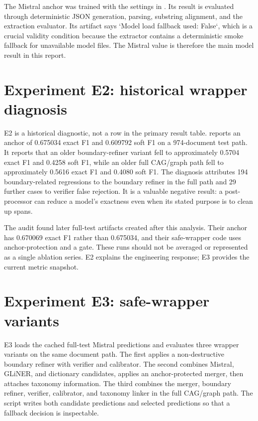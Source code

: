 The Mistral anchor was trained with the settings in . Its result is evaluated through deterministic JSON generation, parsing, substring alignment, and the extraction evaluator. Its artifact says `Model load fallback used: False`, which is a crucial validity condition because the extractor contains a deterministic smoke fallback for unavailable model files. The Mistral value is therefore the main model result in this report.

\section{Experiment E2: historical wrapper diagnosis}

E2 is a historical diagnostic, not a row in the primary result table.  reports an anchor of 0.675034 exact F1 and 0.609792 soft F1 on a 974-document test path. It reports that an older boundary-refiner variant fell to approximately 0.5704 exact F1 and 0.4258 soft F1, while an older full CAG/graph path fell to approximately 0.5616 exact F1 and 0.4080 soft F1. The diagnosis attributes 194 boundary-related regressions to the boundary refiner in the full path and 29 further cases to verifier false rejection. It is a valuable negative result: a post-processor can reduce a model's exactness even when its stated purpose is to clean up spans.

The audit found later full-test artifacts created after this analysis. Their anchor has 0.670069 exact F1 rather than 0.675034, and their safe-wrapper code uses anchor-protection and a gate. These runs should not be averaged or represented as a single ablation series. E2 explains the engineering response; E3 provides the current metric snapshot.

\section{Experiment E3: safe-wrapper variants}

E3 loads the cached full-test Mistral predictions and evaluates three wrapper variants on the same document path. The first applies a non-destructive boundary refiner with verifier and calibrator. The second combines Mistral, GLiNER, and dictionary candidates, applies an anchor-protected merger, then attaches taxonomy information. The third combines the merger, boundary refiner, verifier, calibrator, and taxonomy linker in the full CAG/graph path. The script writes both candidate predictions and selected predictions so that a fallback decision is inspectable.

